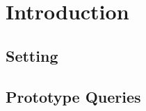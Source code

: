 \chapter{Introduction}
\label{chap:intro}

\section{Setting}
\label{sec:setting}


\section{Prototype Queries}
\label{sec:prototype_queries}

